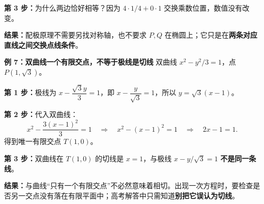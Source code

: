 \begin{examplebox}
\textbf{第 3 步：}为什么两边恰好相等？因为 $4\cdot1/4+0\cdot1$ 交换乘数位置，数值没有改变。

\textbf{结果：}配极原理不需要另找对称轴，也不要求 $P,Q$ 在椭圆上；它只是在\textbf{两条对应直线之间交换点线条件}。

\medskip
\textbf{\textcolor{CExample}{例 7：双曲线一个有限交点，不等于极线是切线}}
双曲线 $x^2-y^2/3=1$，点 $P(1,\sqrt3)$。

\textbf{第 1 步：}极线为 $x-\dfrac{\sqrt3y}{3}=1$，即 $x-\dfrac{y}{\sqrt3}=1$，所以 $y=\sqrt3(x-1)$。

\textbf{第 2 步：}代入双曲线：
\[
x^2-\frac{3(x-1)^2}{3}=1
\quad\Longrightarrow\quad x^2-(x-1)^2=1
\quad\Longrightarrow\quad 2x-1=1.
\]
得到唯一有限交点 $T(1,0)$。

\textbf{第 3 步：}双曲线在 $T(1,0)$ 的切线是 $x=1$，与极线 $x-y/\sqrt3=1$ \textbf{不是同一条线}。

\textbf{结果：}与曲线“只有一个有限交点”不必然意味着相切。出现一次方程时，要检查是否另一交点没有落在有限平面中；高考解答中只需知道\textbf{别把它误认为切线}。
\end{examplebox}

